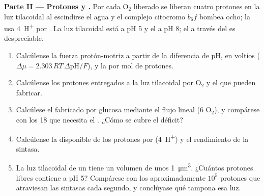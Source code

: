 \begin{problem}
\medskip
\noindent\textbf{Parte II --- Protones y .}
Por cada $\mathrm{O_2}$ liberado se liberan cuatro protones en la luz
tilacoidal al escindirse el agua y el complejo citocromo $b_6f$ bombea ocho;
la  usa \qty{4}{H^+} por . La luz tilacoidal está a pH 5 y el
 a pH 8; el  a través del  es
despreciable.
\begin{enumerate}[resume]
  \item Calcúlense la fuerza protón-motriz a partir de la diferencia de pH,
        en voltios ($\Delta\mu = 2.303\,RT\,\Delta\mathrm{pH}/F$), y la
         por mol de protones.
  \item Calcúlense los protones entregados a la luz tilacoidal por
        $\mathrm{O_2}$ y el  que pueden fabricar.
  \item Calcúlese el  fabricado por glucosa mediante el flujo lineal (6
        $\mathrm{O_2}$), y compárese con los 18 que necesita el . ¿Cómo se cubre el déficit?
  \item Calcúlense la  disponible de los protones por 
        (\qty{4}{H^+}) y el rendimiento de la sintasa.
  \item La luz tilacoidal de un  tiene un volumen de unos
        \qty{1}{\micro m^3}. ¿Cuántos protones libres contiene a pH 5?
        Compárese con los aproximadamente $10^5$ protones que atraviesan
        las sintasas cada segundo, y conclúyase qué tampona esa luz.
\end{enumerate}


\end{problem}
